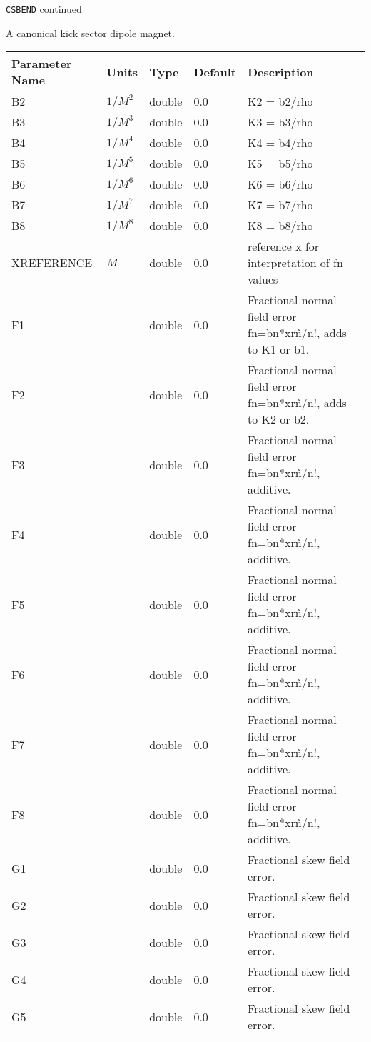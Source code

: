 \newpage
\begin{center}{\Large\verb|CSBEND| continued}\end{center}
A canonical kick sector dipole magnet.
\\
\begin{tabular}{|l|l|l|l|p{\descwidth}|} \hline
Parameter Name & Units & Type & Default & Description \\ \hline 
B2 & $1/M^{2}$ & double &  0.0 & K2 = b2/rho  \\ \hline 
B3 & $1/M^{3}$ & double &  0.0 & K3 = b3/rho  \\ \hline 
B4 & $1/M^{4}$ & double &  0.0 & K4 = b4/rho  \\ \hline 
B5 & $1/M^{5}$ & double &  0.0 & K5 = b5/rho  \\ \hline 
B6 & $1/M^{6}$ & double &  0.0 & K6 = b6/rho  \\ \hline 
B7 & $1/M^{7}$ & double &  0.0 & K7 = b7/rho  \\ \hline 
B8 & $1/M^{8}$ & double &  0.0 & K8 = b8/rho  \\ \hline 
XREFERENCE & $M$ & double &  0.0 & reference x for interpretation of fn values  \\ \hline 
F1 &  & double &  0.0 & Fractional normal field error fn=bn*xr\^n/n!, adds to K1 or b1.  \\ \hline 
F2 &  & double &  0.0 & Fractional normal field error fn=bn*xr\^n/n!, adds to K2 or b2.  \\ \hline 
F3 &  & double &  0.0 & Fractional normal field error fn=bn*xr\^n/n!, additive.  \\ \hline 
F4 &  & double &  0.0 & Fractional normal field error fn=bn*xr\^n/n!, additive.  \\ \hline 
F5 &  & double &  0.0 & Fractional normal field error fn=bn*xr\^n/n!, additive.  \\ \hline 
F6 &  & double &  0.0 & Fractional normal field error fn=bn*xr\^n/n!, additive.  \\ \hline 
F7 &  & double &  0.0 & Fractional normal field error fn=bn*xr\^n/n!, additive.  \\ \hline 
F8 &  & double &  0.0 & Fractional normal field error fn=bn*xr\^n/n!, additive.  \\ \hline 
G1 &  & double &  0.0 & Fractional skew field error.  \\ \hline 
G2 &  & double &  0.0 & Fractional skew field error.  \\ \hline 
G3 &  & double &  0.0 & Fractional skew field error.  \\ \hline 
G4 &  & double &  0.0 & Fractional skew field error.  \\ \hline 
G5 &  & double &  0.0 & Fractional skew field error.  \\ \hline 
\end{tabular}

